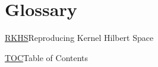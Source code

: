 
\section*{Glossary}\label{glossary}

\thispagestyle{empty}

\def\mylhypertarget{rkhsgloss}
\newcommand{\RKHS}{\hyperlink{\mylhypertarget}{RKHS}}
\newcommand{\RKHSlong}{Reproducing Kernel Hilbert Space}
{\RKHS \tab \hypertarget{\mylhypertarget}{\RKHSlong} \par}

\def\mylhypertarget{tocgloss}
\newcommand{\mytoc}{\hyperlink{\mylhypertarget}{TOC}}
\newcommand{\mytoclong}{Table of Contents}
{\mytoc \tab \hypertarget{\mylhypertarget}{\mytoclong} \par}













\cleardoublepage